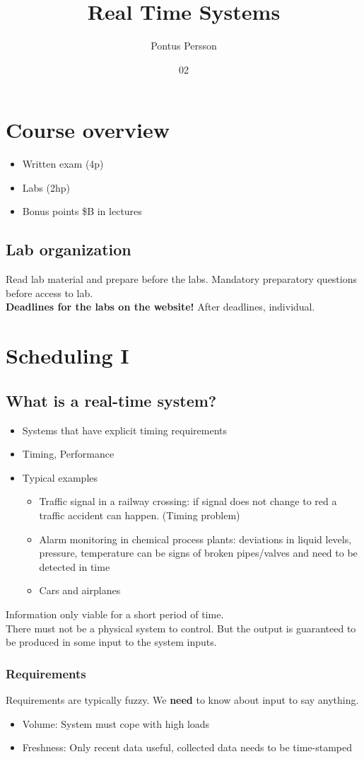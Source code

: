 \documentclass[course, english]{Notes}
\title{Real Time Systems}
\author{Pontus Persson}
\date{02}{11}{2015}
\begin{document}
\section{Course overview}
\begin{itemize}
	\item Written exam (4p)
	\item Labs (2hp)
	\item Bonus points \$B in lectures
\end{itemize}
\subsection{Lab organization}
Read lab material and prepare before the labs. Mandatory preparatory questions
before access to lab.
\\
\textbf{Deadlines for the labs on the website!}
After deadlines, individual.

\section{Scheduling I}
\subsection{What is a real-time system?}
\begin{itemize}
	\item Systems that have explicit timing requirements
	\item Timing, Performance
	\item Typical examples
		\begin{itemize}
			\item Traffic signal in a railway crossing: if signal
				does not change to red a traffic accident can
				happen. (Timing problem)
			\item Alarm monitoring in chemical process plants:
				deviations in liquid levels, pressure,
				temperature can be signs of broken pipes/valves
				and need to be detected in time
			\item Cars and airplanes
		\end{itemize}
\end{itemize}
Information only viable for a short period of time. \\
There must not be a physical system to control. But the output is guaranteed to
be produced in some input to the system inputs.

\subsubsection{Requirements}
Requirements are typically fuzzy. We \textbf{need} to know about input to say
anything.
\begin{itemize}
	\item Volume: System must cope with high loads
	\item Freshness: Only recent data useful, collected data needs to be
		time-stamped

\end{itemize}
\end{document}
